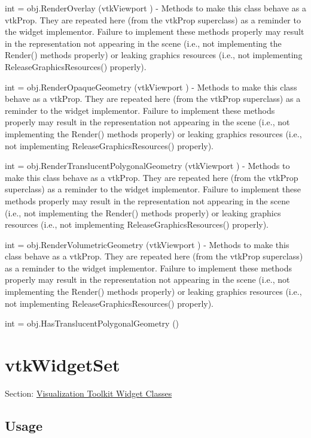 \begin{DoxyItemize}
\item {\ttfamily int = obj.\-Render\-Overlay (vtk\-Viewport )} -\/ Methods to make this class behave as a vtk\-Prop. They are repeated here (from the vtk\-Prop superclass) as a reminder to the widget implementor. Failure to implement these methods properly may result in the representation not appearing in the scene (i.\-e., not implementing the Render() methods properly) or leaking graphics resources (i.\-e., not implementing Release\-Graphics\-Resources() properly).  
\item {\ttfamily int = obj.\-Render\-Opaque\-Geometry (vtk\-Viewport )} -\/ Methods to make this class behave as a vtk\-Prop. They are repeated here (from the vtk\-Prop superclass) as a reminder to the widget implementor. Failure to implement these methods properly may result in the representation not appearing in the scene (i.\-e., not implementing the Render() methods properly) or leaking graphics resources (i.\-e., not implementing Release\-Graphics\-Resources() properly).  
\item {\ttfamily int = obj.\-Render\-Translucent\-Polygonal\-Geometry (vtk\-Viewport )} -\/ Methods to make this class behave as a vtk\-Prop. They are repeated here (from the vtk\-Prop superclass) as a reminder to the widget implementor. Failure to implement these methods properly may result in the representation not appearing in the scene (i.\-e., not implementing the Render() methods properly) or leaking graphics resources (i.\-e., not implementing Release\-Graphics\-Resources() properly).  
\item {\ttfamily int = obj.\-Render\-Volumetric\-Geometry (vtk\-Viewport )} -\/ Methods to make this class behave as a vtk\-Prop. They are repeated here (from the vtk\-Prop superclass) as a reminder to the widget implementor. Failure to implement these methods properly may result in the representation not appearing in the scene (i.\-e., not implementing the Render() methods properly) or leaking graphics resources (i.\-e., not implementing Release\-Graphics\-Resources() properly).  
\item {\ttfamily int = obj.\-Has\-Translucent\-Polygonal\-Geometry ()}  
\end{DoxyItemize}\hypertarget{vtkwidgets_vtkwidgetset}{}\section{vtk\-Widget\-Set}\label{vtkwidgets_vtkwidgetset}
Section\-: \hyperlink{sec_vtkwidgets}{Visualization Toolkit Widget Classes} \hypertarget{vtkwidgets_vtkxyplotwidget_Usage}{}\subsection{Usage}\label{vtkwidgets_vtkxyplotwidget_Usage}
